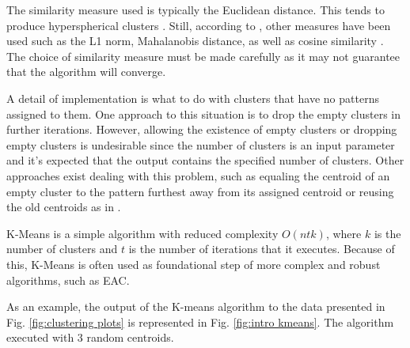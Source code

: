 The similarity measure used is typically the Euclidean distance.
This tends to produce hyperspherical clusters \cite{Jain1999}.
Still, according to \cite{Jain2010}, other measures have been used such as the L1 norm, Mahalanobis distance, as well as cosine similarity \cite{Aggarwal2014}.
The choice of similarity measure must be made carefully as it may not guarantee that the algorithm will converge.

A detail of implementation is what to do with clusters that have no patterns assigned to them.
One approach to this situation is to drop the empty clusters in further iterations.
However, allowing the existence of empty clusters or dropping empty clusters is undesirable since the number of clusters is an input parameter and it's expected that the output contains the specified number of clusters.
Other approaches exist dealing with this problem, such as equaling the centroid of an empty cluster to the pattern furthest away from its assigned centroid or reusing the old centroids as in \cite{Pakhira2009}.

K-Means is a simple algorithm with reduced complexity $O(ntk)$, where $k$ is the number of clusters and $t$ is the number of iterations that it executes.
Because of this, K-Means is often used as foundational step of more complex and robust algorithms, such as EAC.




As an example, the output of the K-means algorithm to the data presented in Fig. \ref{fig:clustering plots} is represented in Fig. \ref{fig:intro kmeans}.
The algorithm executed with 3 random centroids.

